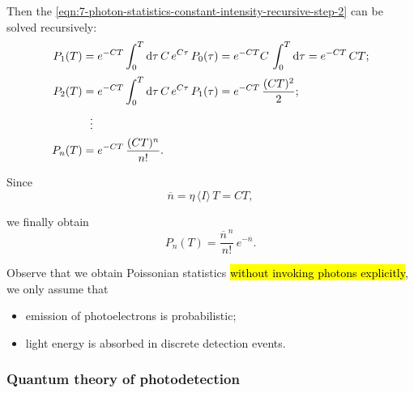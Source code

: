 Then the \eqref{eqn:7-photon-statistics-constant-intensity-recursive-step-2} can be solved recursively:
\begin{equation}\label{eqn:7-photon-statistics-constant-intensity-recursive-solution}
\begin{split}
    P_1(T) &= e^{-CT}\int_0^T \mathrm{d}\tau\, C\,e^{C\tau}\,P_0(\tau)
    = e^{-CT} C\,\int_0^T \mathrm{d}\tau
    = e^{-CT}\,CT;\\[0.5ex]
    P_2(T) &= e^{-CT}\int_0^T \mathrm{d}\tau\, C\,e^{C\tau}\,P_1(\tau)
    = e^{-CT}\,\frac{(CT)^2}{2};\\[0.5ex]
    &\ \ \vdots \\
    P_n(T) &= e^{-CT}\,\frac{(CT)^n}{n!}.
\end{split}
\end{equation}

Since
\[
\overline{n}=\eta\,\langle I\rangle\,T=CT,
\]

we finally obtain
\begin{equation}\label{eqn:7-photon-statistics-poissonian}
P_n(T)=\frac{\overline{n}^{\,n}}{n!}\,e^{-\overline{n}}.
\end{equation}


Observe that we obtain Poissonian statistics \hl{without invoking photons explicitly}, we only assume that
\begin{itemize}
    \item emission of photoelectrons is probabilistic;
    \item light energy is absorbed in discrete detection events.
\end{itemize}


\subsubsection{Quantum theory of photodetection}\label{subsubsec:7-quantum-theory-photodetection}

